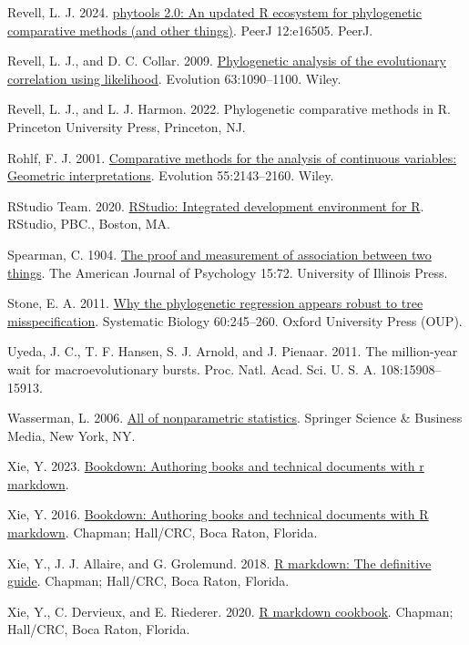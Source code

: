 \documentclass[fleqn,10pt,lineno]{wlpeerj} %
\newlength{\cslhangindent}
\newenvironment{CSLReferences}[2] %
 {\begin{list}{}{%
  \setlength{\itemindent}{0pt}
  \setlength{\leftmargin}{0pt}
  \setlength{\parsep}{0pt}
  \ifodd #1
   \setlength{\leftmargin}{\cslhangindent}
   \setlength{\itemindent}{-1\cslhangindent}
  \fi
  \setlength{\itemsep}{#2\baselineskip}}}
 {\end{list}}
\begin{document}
\begin{CSLReferences}{1}{0}
Revell, L. J. 2024. \href{https://doi.org/10.7717/peerj.16505}{{p}hytools 2.0: An updated {R} ecosystem for phylogenetic comparative methods (and other things)}. PeerJ 12:e16505. PeerJ.

Revell, L. J., and D. C. Collar. 2009. \href{https://doi.org/10.1111/j.1558-5646.2009.00616.x}{Phylogenetic analysis of the evolutionary correlation using likelihood}. Evolution 63:1090--1100. Wiley.

Revell, L. J., and L. J. Harmon. 2022. Phylogenetic comparative methods in {R}. Princeton University Press, Princeton, NJ.

Rohlf, F. J. 2001. \href{https://doi.org/10.1111/j.0014-3820.2001.tb00731.x}{Comparative methods for the analysis of continuous variables: Geometric interpretations}. Evolution 55:2143--2160. Wiley.

RStudio Team. 2020. \href{http://www.rstudio.com/}{R{S}tudio: Integrated development environment for {R}}. RStudio, PBC., Boston, MA.

Spearman, C. 1904. \href{https://doi.org/10.2307/1412159}{The proof and measurement of association between two things}. The American Journal of Psychology 15:72. University of Illinois Press.

Stone, E. A. 2011. \href{https://doi.org/10.1093/sysbio/syq098}{Why the phylogenetic regression appears robust to tree misspecification}. Systematic Biology 60:245--260. Oxford University Press (OUP).

Uyeda, J. C., T. F. Hansen, S. J. Arnold, and J. Pienaar. 2011. The million-year wait for macroevolutionary bursts. Proc. Natl. Acad. Sci. U. S. A. 108:15908--15913.

Wasserman, L. 2006. \href{https://doi.org/10.1007/0-387-30623-4}{All of nonparametric statistics}. Springer Science \& Business Media, New York, NY.

Xie, Y. 2023. \href{https://github.com/rstudio/bookdown}{Bookdown: Authoring books and technical documents with r markdown}.

Xie, Y. 2016. \href{https://bookdown.org/yihui/bookdown}{Bookdown: Authoring books and technical documents with {R} markdown}. Chapman; Hall/CRC, Boca Raton, Florida.

Xie, Y., J. J. Allaire, and G. Grolemund. 2018. \href{https://bookdown.org/yihui/rmarkdown}{R markdown: The definitive guide}. Chapman; Hall/CRC, Boca Raton, Florida.

Xie, Y., C. Dervieux, and E. Riederer. 2020. \href{https://bookdown.org/yihui/rmarkdown-cookbook}{R markdown cookbook}. Chapman; Hall/CRC, Boca Raton, Florida.

\end{CSLReferences}
\end{document}
